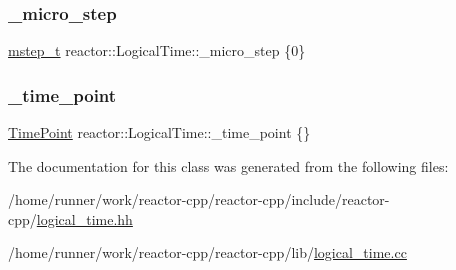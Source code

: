 \subsubsection{\texorpdfstring{\+\_\+micro\+\_\+step}{\_micro\_step}}
{\footnotesize\ttfamily \hyperlink{namespacereactor_aaea1189d617982457b74127ba74a7340}{mstep\+\_\+t} reactor\+::\+Logical\+Time\+::\+\_\+micro\+\_\+step \{0\}\hspace{0.3cm}{\ttfamily [private]}}

\mbox{\label{classreactor_1_1LogicalTime_a00ea2389e8dd656986c559690343d963}} 
\subsubsection{\texorpdfstring{\+\_\+time\+\_\+point}{\_time\_point}}
{\footnotesize\ttfamily \hyperlink{namespacereactor_ad950f8d1a46612500286a4af0f167080}{Time\+Point} reactor\+::\+Logical\+Time\+::\+\_\+time\+\_\+point \{\}\hspace{0.3cm}{\ttfamily [private]}}



The documentation for this class was generated from the following files\+:\begin{DoxyCompactItemize}
\item 
/home/runner/work/reactor-\/cpp/reactor-\/cpp/include/reactor-\/cpp/\hyperlink{logical__time_8hh}{logical\+\_\+time.\+hh}\item 
/home/runner/work/reactor-\/cpp/reactor-\/cpp/lib/\hyperlink{logical__time_8cc}{logical\+\_\+time.\+cc}\end{DoxyCompactItemize}
